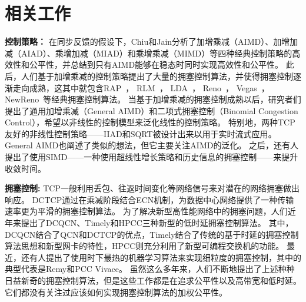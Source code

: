 \documentclass[winfonts]{njuthesis}
\begin{document}
\chapter{相关工作}\label{chapter:related works}

{\bf 控制策略：} 
在同步反馈的假设下，Chiu和Jain分析了加增乘减（AIMD）、加增加减（AIAD）、乘增加减（MIAD）和乘增乘减（MIMD）等四种经典控制策略的高效性和公平性，并总结到只有AIMD能够在稳态时同时实现高效性和公平性\cite{chiu1989analysis}。
此后，人们基于加增乘减的控制策略提出了大量的拥塞控制算法，并使得拥塞控制逐渐走向成熟，这其中就包含RAP~\cite{rejaie1999rap}， RLM~\cite{mccanne1996rlm}， LDA~\cite{sisalem1998lda}， Reno~\cite{jacobson1990modified}， Vegas~\cite{brakmo1995tcp}， NewReno~\cite{Henderson2012NewReno}等经典拥塞控制算法。
当基于加增乘减的拥塞控制成熟以后，研究者们提出了通用加增乘减（General AIMD）\cite{yang2000general}和二项式拥塞控制（Binomial Congestion Control）\cite{bansal2001binomial}，希望以非线性的控制模型来泛化线性的控制策略。
特别地，两种TCP友好的非线性控制策略——IIAD和SQRT被设计出来以用于实时流式应用\cite{bansal2001binomial}。
General AIMD\cite{yang2000general}也阐述了类似的想法，但它主要关注AIMD的泛化。
之后，还有人提出了使用SIMD——一种使用超线性增长策略和历史信息的拥塞控制——来提升收敛时间。

{\bf 拥塞控制: }
TCP一般利用丢包\cite{jacobson1990modified,Henderson2012NewReno,ha2008cubic}、往返时间变化\cite{brakmo1995tcp,cardwell2016bbr,arun2018copa,Zeng2019cc}等网络信号来对潜在的网络拥塞做出响应。
DCTCP\cite{alizadeh2010data,alizadeh2011analysis}通过在乘减阶段结合ECN机制，为数据中心网络提供了一种传输速率更为平滑的拥塞控制算法。
为了解决新型高性能网络中的拥塞问题，人们近年来提出了DCQCN\cite{zhu2015congestion}、Timely\cite{mittal2015timely}和HPCC\cite{li2019hpcc}三种新型的低时延拥塞控制算法。
其中，DCQCN结合了QCN\cite{pan2007qcn}和DCTCP\cite{alizadeh2010data}的优点，Timely结合了传统的基于时延的拥塞控制算法思想和新型网卡的特性，HPCC则充分利用了新型可编程交换机的功能。
最近，还有人提出了使用时下最热的机器学习算法来实现细粒度的拥塞控制，其中的典型代表是Remy\cite{winstein2013remy}和PCC Vivace\cite{dong2018pcc}。
虽然这么多年来，人们不断地提出了上述种种日益新奇的拥塞控制算法，但是这些工作都是在追求公平性以及高带宽和低时延。
它们都没有关注过应该如何实现拥塞控制算法的加权公平性。
\end{document}
